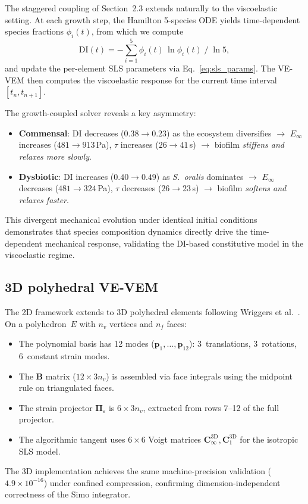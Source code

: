 The staggered coupling of Section~2.3 extends naturally to the viscoelastic
setting.  At each growth step, the Hamilton 5-species ODE yields
time-dependent species fractions $\phi_i(t)$, from which we compute
\begin{equation}
  \mathrm{DI}(t) = -\sum_{i=1}^{5} \phi_i(t)\,\ln\phi_i(t) \;/\; \ln 5,
\end{equation}
and update the per-element SLS parameters via Eq.~\eqref{eq:sls_params}.
The VE-VEM then computes the viscoelastic response for the current time
interval $[t_n, t_{n+1}]$.

The growth-coupled solver reveals a key asymmetry:
\begin{itemize}
  \item \textbf{Commensal}: DI decreases ($0.38 \to 0.23$) as the ecosystem
    diversifies $\to$ $E_\infty$ increases ($481 \to 913$\,Pa),
    $\tau$ increases ($26 \to 41$\,s) $\to$ biofilm \emph{stiffens and relaxes
    more slowly}.
  \item \textbf{Dysbiotic}: DI increases ($0.40 \to 0.49$) as \emph{S.~oralis}
    dominates $\to$ $E_\infty$ decreases ($481 \to 324$\,Pa),
    $\tau$ decreases ($26 \to 23$\,s) $\to$ biofilm \emph{softens and relaxes
    faster}.
\end{itemize}
This divergent mechanical evolution under identical initial conditions
demonstrates that species composition dynamics directly drive the
time-dependent mechanical response, validating the DI-based constitutive
model in the viscoelastic regime.

\subsection{3D polyhedral VE-VEM}
\label{sec:vem:3d}

The 2D framework extends to 3D polyhedral elements following
Wriggers et al.~\cite{Wriggers2019,Wriggers2024}.  On a polyhedron~$E$ with
$n_v$ vertices and $n_f$ faces:
\begin{itemize}
  \item The polynomial basis has 12 modes
    ($\mathbf{p}_1, \ldots, \mathbf{p}_{12}$):
    3~translations, 3~rotations, 6~constant strain modes.
  \item The $\mathbf{B}$ matrix ($12 \times 3n_v$) is assembled via
    face integrals using the midpoint rule on triangulated faces.
  \item The strain projector $\boldsymbol{\Pi}_\varepsilon$ is
    $6 \times 3n_v$, extracted from rows 7--12 of the full projector.
  \item The algorithmic tangent uses $6 \times 6$ Voigt matrices
    $\mathbf{C}_\infty^{3\mathrm{D}}, \mathbf{C}_1^{3\mathrm{D}}$
    for the isotropic SLS model.
\end{itemize}
The 3D implementation achieves the same machine-precision validation
($4.9 \times 10^{-16}$) under confined compression, confirming
dimension-independent correctness of the Simo integrator.

